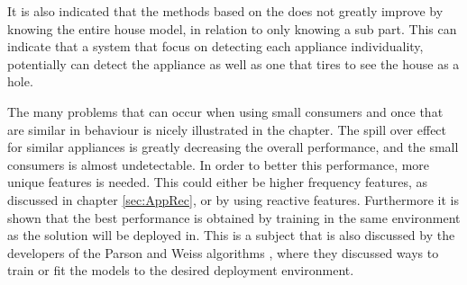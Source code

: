 It is also indicated that the methods based on the  does not greatly improve by knowing the entire house model, in relation to only knowing a sub part. This can indicate that a system that focus on detecting each appliance individuality, potentially can detect the appliance as well as one that tires to see the house as a hole.   

The many problems that can occur when using small consumers and once that are similar in behaviour is nicely illustrated in the chapter. The spill over effect for similar appliances is greatly decreasing the overall performance, and the small consumers is almost undetectable. In order to better this performance, more unique features is needed. This could either be higher frequency features, as discussed in chapter \ref{sec:AppRec}, or by using reactive features. Furthermore it is shown that the best performance is obtained by training in the same environment as the solution will be deployed in. This is a subject that is also discussed by the developers of the Parson and Weiss algorithms \citep{RefWorks:28} \citep{RefWorks:23}, where they discussed ways to train or fit the models to the desired deployment environment.  